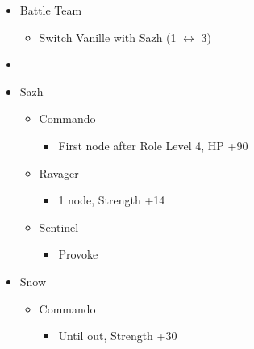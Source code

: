 \documentclass{report}
\begin{document}
\begin{menu}
\begin{itemize}
    \paradigm
    \begin{itemize}
        \item Battle Team
        \begin{itemize}
            \item Switch Vanille with Sazh (1 $\leftrightarrow$ 3)
        \end{itemize}
        \item {}%
{\paradigmline{\com}{\com}{\med}}%
{\paradigmline{\com}{\com}{(\com)}}%
{\paradigmline{(\rav)}{(\rav)}{(\med)}}%
{\paradigmline{\textit{\com}}{\textit{\rav}}{\textit(\sab)}}%
{\paradigmline{\rav}{\rav}{\sab}}%
{\paradigmline{\rav}{\rav}{\rav}}
    \end{itemize}
    \crystarium
    \begin{itemize}
        \item Sazh
        \begin{itemize}
            \item Commando
            \begin{itemize}
                \item First node after Role Level 4, HP +90
            \end{itemize}
            \item Ravager
            \begin{itemize}
                \item 1 node, Strength +14
            \end{itemize}
            \item Sentinel
            \begin{itemize}
                \item Provoke
            \end{itemize}
        \end{itemize}
        \item Snow
        \begin{itemize}
            \item Commando
            \begin{itemize}
                \item Until out, Strength +30
            \end{itemize}
        \end{itemize}
    \end{itemize}
    \equip
    \begin{itemize}

\end{itemize}
\end{itemize}
\end{menu}
\end{document}
